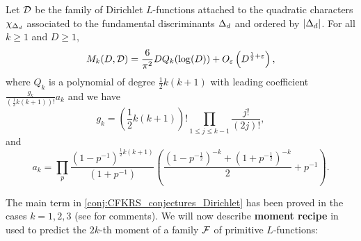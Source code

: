   \begin{conjecture}\label{conj:CFKRS_conjectures_Dirichlet}
    Let $\mathcal{D}$ be the family of Dirichlet $L$-functions attached to the quadratic characters $\chi_{\Delta_{d}}$ associated to the fundamental discriminants $\Delta_{d}$ and ordered by $|\Delta_{d}|$. For all $k \ge 1$ and $D \ge 1$,
    \[
      M_{k}(D,\mathcal{D}) = \frac{6}{\pi^{2}}DQ_{k}(\log(D))+O_{\varepsilon}\left(D^{\frac{1}{2}+\varepsilon}\right),
    \]
    where $Q_{k}$ is a polynomial of degree $\frac{1}{2}k(k+1)$ with leading coefficient $\frac{g_{k}}{\left(\frac{1}{2}k(k+1)\right)!}a_{k}$ and we have
    \[
      g_{k} = \left(\frac{1}{2}k(k+1)\right)!\prod_{1 \le j \le k-1}\frac{j!}{(2j)!},
    \]
    and
    \[
      a_{k} = \prod_{p}\frac{(1-p^{-1})^{\frac{1}{2}k(k+1)}}{(1+p^{-1})}\left(\frac{(1-p^{-\frac{1}{2}})^{-k}+(1+p^{-\frac{1}{2}})^{-k}}{2}+p^{-1}\right).
    \]
  \end{conjecture}

  The main term in \cref{conj:CFKRS_conjectures_Dirichlet} has been proved in the cases $k = 1,2,3$ (see \cite{conrey2005integral} for comments). We will now describe \textbf{moment recipe} in \cite{conrey2005integral} used to predict the $2k$-th moment of a family $\mathcal{F}$ of primitive $L$-functions:

